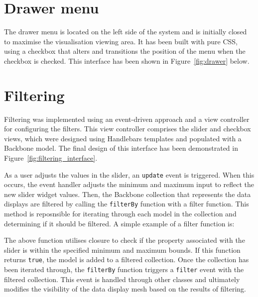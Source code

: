 \section{Drawer menu} {
\label{sec:drawer}

	The drawer menu is located on the left side of the system and is initially closed to maximise the visualisation viewing area. It has been built with pure CSS, using a checkbox that alters and transitions the position of the menu when the checkbox is checked. This interface has been shown in Figure~\ref{fig:drawer} below.

	

}

\section{Filtering} {
\label{sec:filtering_implementation}

	Filtering was implemented using an event-driven approach and a view controller for configuring the filters. This view controller comprises the slider and checkbox views, which were designed using Handlebars templates and populated with a Backbone model. The final design of this interface has been demonstrated in Figure~\ref{fig:filtering_interface}.

	

	As a user adjusts the values in the slider, an \texttt{update} event is triggered. When this occurs, the event handler adjusts the minimum and maximum input to reflect the new slider widget values. Then, the Backbone collection that represents the data displays are filtered by calling the \texttt{filterBy} function with a filter function. This method is reposnsible for iterating through each model in the collection and determining if it should be filtered. A simple example of a filter function is:

	

	The above function utilises closure to check if the property associated with the slider is within the specified minimum and maximum bounds. If this function returns \texttt{true}, the model is added to a filtered collection. Once the collection has been iterated through, the \texttt{filterBy} function triggers a \texttt{filter} event with the filtered collection. This event is handled through other classes and ultimately modifies the visibility of the data display mesh based on the results of filtering.

}
